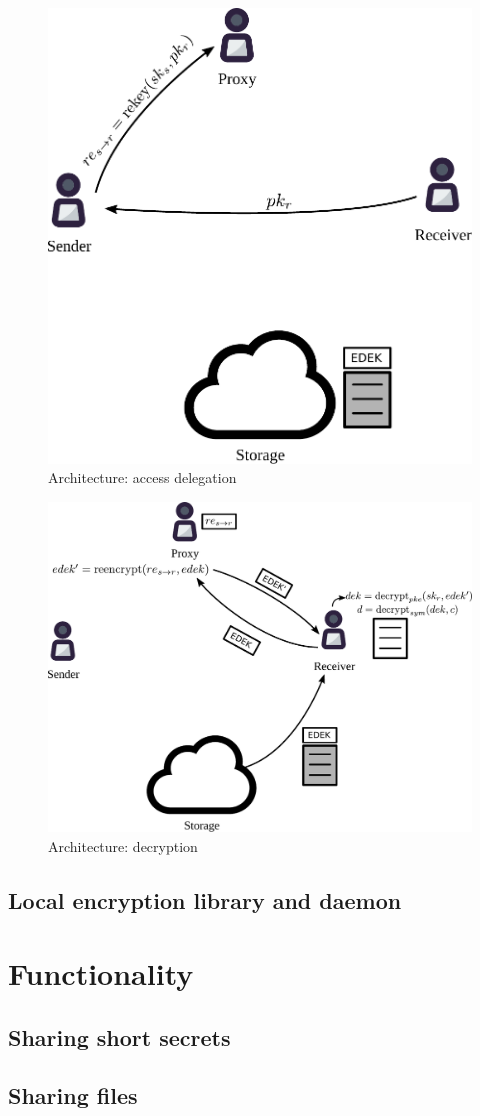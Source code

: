\documentclass[notitlepage,longbibliography]{revtex4-1}
\begin{document}
\begin{figure}
\centering
    \includegraphics[width=0.4\columnwidth]{pdf/delegate.pdf}
    \caption{Architecture: access delegation}
    \label{fig:pre}
\end{figure}
\begin{figure}
\centering
    \includegraphics[width=0.6\columnwidth]{pdf/decrypt.pdf}
    \caption{Architecture: decryption}
    \label{fig:pre}
\end{figure}

\subsection{Local encryption library and daemon}

\section{Functionality}

\subsection{Sharing short secrets}

\subsection{Sharing files}
\end{document}
